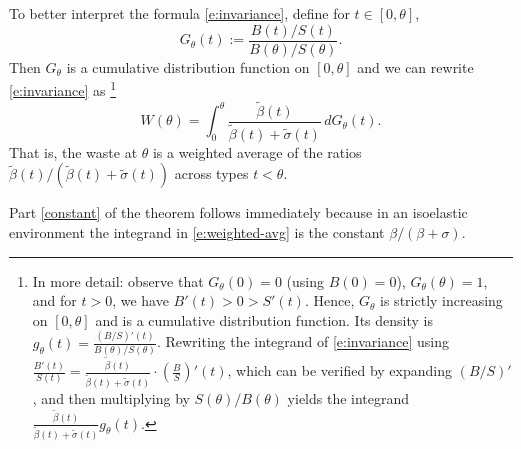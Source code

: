 \documentclass[12 pt]{article}
\makeatletter
\newenvironment{proof}[1][Proof]{\noindent\textbf{#1} }{\ \rule{0.5em}{0.5em}}
\theoremstyle{remark}
\theoremstyle{definition}
\def\typemin{0}
\newcommand{\elaB}{\tilde\beta}   %
\newcommand{\elaS}{\tilde\sigma}  %
\renewenvironment{proof}[1][\proofname] {\par\pushQED{\qed}\normalfont\topsep6\p@\@plus6\p@\relax\trivlist\item[\hskip\labelsep\bfseries#1\@addpunct{.}]\ignorespaces}{\popQED\endtrivlist\@endpefalse}
\let\oldfootnote\footnote
\renewcommand\footnote[1]{\oldfootnote{\hspace{.5mm}#1}}
\makeatother
\begin{document}
\begin{proof}[Proof of \autoref{thm:constant}]
To better interpret the formula \eqref{e:invariance}, define %
for $t\in [\typemin,\theta]$, 
\[G_\theta(t) := \frac{B(t)/S(t)}{B(\theta)/S(\theta)}.\]
Then $G_\theta$ is a cumulative distribution function on $[\typemin,\theta]$ and we can rewrite \eqref{e:invariance} as%
\footnote{\label{fn:weighted-avg}In more detail: observe that $G_\theta(\typemin)=0$ (using $B(\typemin)=0$),  $G_\theta(\theta)=1$, and for $t>0$, we have $B'(t)>0>S'(t)$.  Hence, $G_\theta$ is strictly increasing on $[\typemin,\theta]$ and is a cumulative distribution function. Its density is $g_\theta(t) = \frac{(B/S)'(t)}{B(\theta)/S(\theta)}$. Rewriting the integrand of \eqref{e:invariance} using $\frac{B'(t)}{S(t)} = \frac{\elaB(t)}{\elaB(t)+\elaS(t)} \cdot \left(\frac{B}{S}\right)'(t)$, which can be verified by expanding $(B/S)'$, and then multiplying by ${S(\theta)}/{B(\theta)}$ yields the integrand $\frac{\elaB(t)}{\elaB(t)+\elaS(t)}g_\theta(t)$.
}
\begin{equation}
\label{e:weighted-avg}
W(\theta) = \int_0^\theta \frac{\elaB(t)}{\elaB(t)+\elaS(t)} \, dG_\theta(t).
\end{equation}
That is, the waste at $\theta$ is a weighted average of the ratios ${\elaB(t)}/{(\elaB(t)+\elaS(t))}$ across types $t<\theta$.

Part \ref{constant} of the theorem follows immediately because in an isoelastic environment the integrand in \eqref{e:weighted-avg} is the constant $\beta/(\beta+\sigma)$. \qedhere

\end{proof}
\end{document}
